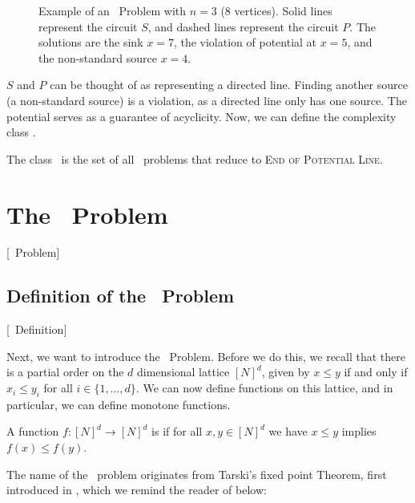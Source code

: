 \begin{figure}[ht]
    \centering
    \caption[Example of an \EOPL\ Problem]{Example of an \EOPL\ Problem with $n=3$ (8 vertices).
        Solid lines represent the circuit $S$, and dashed lines represent the circuit $P$.
        The solutions are the sink $x=7$, the violation of potential at $x=5$, and the non-standard source $x=4$.}
    \label{fig:eopl_example}
\end{figure}

$S$ and $P$ can be thought of as representing a directed line. Finding another source (a non-standard source) is a violation, as a directed line only has one source. The potential serves as a guarantee of acyclicity. Now, we can define the complexity class \EOPL.

\begin{definition}[\EOPL]
    The class \EOPL\ is the set of all \TFNP\ problems that reduce to \textsc{End of Potential Line}.
\end{definition}

\section{The \Tarski\ Problem}[\Tarski\ Problem]
\label{sec:tarski_problem}

\subsection{Definition of the \Tarski\ Problem}[\Tarski\ Definition]

Next, we want to introduce the \Tarski\ Problem. Before we do this, we recall that there is a partial order on the $d$ dimensional lattice ${[N]}^d$, given by $x \leq y$ if and only if $x_i \leq y_i$ for all $i \in \{1, \dots, d\}$. We can now define functions on this lattice, and in particular, we can define monotone functions.

\begin{definition}
    A function $f : {[N]}^d \rightarrow {[N]}^d$ is  if for all $x, y \in {[N]}^d$ we have $x \leq y$ implies $f(x) \leq f(y)$.
\end{definition}

The name of the \Tarski\ problem originates from Tarski's fixed point Theorem, first introduced in , which we remind the reader of below:

